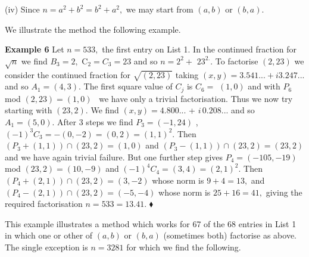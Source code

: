 \documentclass[12pt]{article}
\begin{document}
(iv) Since $n=a^{2}+b^{2}=b^{2}+a^{2},$ we may start from $\left( a,b\right) 
$ or $\left( b,a\right) .$

We illustrate the method the following example.

\textbf{Example 6 }Let $n=533,$ the first entry on List 1. In the continued
fraction for $\sqrt{n}$ we find $B_{3}=2,$ C$_{2}=C_{3}=23$ and so $n=2^{2}+$
$23^{2.}.$ To factorise $\left( 2,23\right) $ we consider the continued
fraction for $\sqrt{\left( 2,23\right) }$ taking $\left( x,y\right)
=3.541...+i3.247...$ and so $A_{1}=\left( 4,3\right) .$ The first square
value of $C_{j}$ is $C_{6}=$ $\left( 1,0\right) $ and with $P_{6}$ mod $%
\left( 2,23\right) =\left( 1,0\right) $ \ we have only a trivial
factorisation. Thus we now try starting with $\left( 23,2\right) .$ We find $%
\left( x,y\right) =4.800...$ + $i\,0.208...$ and so $A_{1}=\left( 5,0\right)
.$ After 3 steps we find $P_{3}=\left( -1,24\right) $ , $\left( -1\right)
^{3}C_{3}=-\left( 0,-2\right) =\left( 0,2\right) =\left( 1,1\right) ^{2}.$
Then $\left( P_{3}+\left( 1,1\right) \right) \cap \left( 23,2\right) =\left(
1,0\right) $ and $\left( P_{3}-\left( 1,1\right) \right) \cap \left(
23,2\right) =\left( 23,2\right) $ and we have again trivial failure. But one
further step gives $P_{4}=\left( -105,-19\right) $ mod $\left( 23,2\right)
=\left( 10,-9\right) $ and $\left( -1\right) ^{4}C_{4}=\left( 3,4\right)
=\left( 2,1\right) ^{2}.$ Then $\left( P_{4}+\left( 2,1\right) \right) \cap
\left( 23,2\right) =\left( 3,-2\right) $ whose norm is $9+4=13,$ and $\left(
P_{4}-\left( 2,1\right) \right) \cap \left( 23,2\right) =\left( -5,-4\right) 
$ whose norm is $25+16=41,$ giving the required factorisation $n=533=13.41$. 
$\blacklozenge $

This example illustrates a method which works for 67 of the 68 entries in
List 1 in which one or other of $\left( a,b\right) $ or $\left( b,a\right) $
(sometimes both) factorise as above. The single exception is $n=3281$ for
which we find the following.
\end{document}
